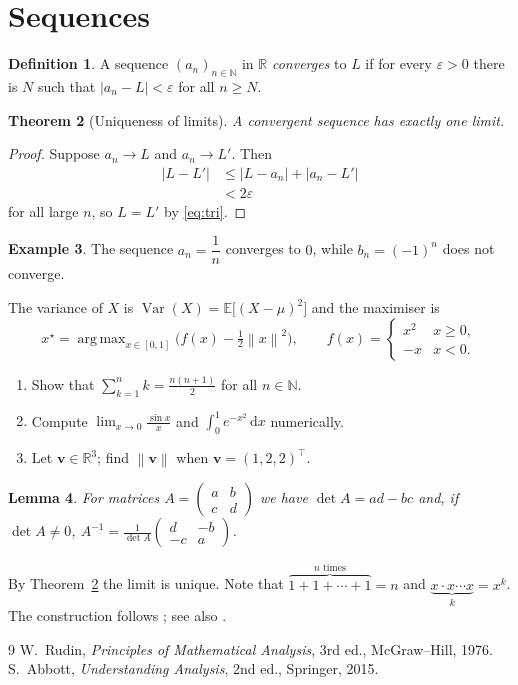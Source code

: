 \documentclass[11pt]{article}
\newtheorem{theorem}{Theorem}[section]
\newtheorem{lemma}[theorem]{Lemma}
\theoremstyle{definition}
\newtheorem{definition}[theorem]{Definition}
\newtheorem{example}[theorem]{Example}
\newcommand{\R}{\mathbb{R}}
\newcommand{\N}{\mathbb{N}}
\newcommand{\abs}[1]{\left\lvert #1 \right\rvert}
\newcommand{\norm}[1]{\left\lVert #1 \right\rVert}
\DeclareMathOperator{\Var}{Var}
\DeclareMathOperator*{\argmax}{arg\,max}
\begin{document}
\section{Sequences}
\begin{definition}
A sequence $(a_n)_{n\in\N}$ in $\R$ \emph{converges} to $L$ if for every $\varepsilon>0$ there is $N$ such that $\abs{a_n-L}<\varepsilon$ for all $n\geq N$.
\end{definition}

\begin{theorem}[Uniqueness of limits]\label{thm:unique}
A convergent sequence has exactly one limit.
\end{theorem}
\begin{proof}
Suppose $a_n\to L$ and $a_n\to L'$. Then
\begin{align}
  \abs{L-L'} &\leq \abs{L-a_n}+\abs{a_n-L'} \label{eq:tri}\\
             &< 2\varepsilon
\end{align}
for all large $n$, so $L=L'$ by \eqref{eq:tri}.
\end{proof}

\begin{example}
The sequence $a_n = \dfrac{1}{n}$ converges to $0$, while $b_n = (-1)^n$ does not converge.
\end{example}

The variance of $X$ is $\Var(X) = \mathbb{E}\big[(X-\mu)^2\big]$ and the maximiser is
\[
  x^\star = \argmax_{x\in[0,1]} \bigl( f(x) - \tfrac{1}{2}\norm{x}^2 \bigr),
  \qquad
  f(x) = \begin{cases} x^2 & x \geq 0,\\ -x & x < 0. \end{cases}
\]

\begin{enumerate}[label=\roman*)]
  \item Show that $\sum_{k=1}^{n} k = \frac{n(n+1)}{2}$ for all $n \in \N$.
  \item Compute $\lim_{x\to 0} \frac{\sin x}{x}$ and $\int_0^1 e^{-x^2}\,\mathrm{d}x$ numerically.
  \item Let $\bm{v} \in \R^3$; find $\norm{\bm{v}}$ when $\bm{v} = (1,2,2)^{\top}$.
\end{enumerate}

\begin{lemma}
For matrices $A = \begin{pmatrix} a & b \\ c & d \end{pmatrix}$ we have $\det A = ad - bc$ and, if $\det A \neq 0$, $A^{-1} = \frac{1}{\det A}\begin{pmatrix} d & -b \\ -c & a\end{pmatrix}$.
\end{lemma}
By Theorem~\ref{thm:unique} the limit is unique. Note that $\overbrace{1+1+\cdots+1}^{n\text{ times}} = n$ and $\underbrace{x \cdot x \cdots x}_{k} = x^k$. The construction follows \cite{rudin1976}; see also \cite[Ch.~2]{abbott2015}.

\begin{thebibliography}{9}
 W.~Rudin, \emph{Principles of Mathematical Analysis}, 3rd ed., McGraw--Hill, 1976.
 S.~Abbott, \emph{Understanding Analysis}, 2nd ed., Springer, 2015.
\end{thebibliography}
\end{document}
